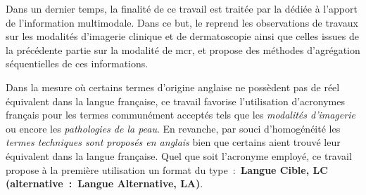 Dans un dernier temps, la finalité de ce travail est traitée par la  dédiée à l'apport de l'information multimodale. Dans ce but, le  reprend les observations de travaux sur les modalités d'imagerie clinique et de dermatoscopie ainsi que celles issues de la précédente partie sur la modalité de \gls{mcr}, et propose des méthodes d'agrégation séquentielles de ces informations.\par

Dans la mesure où certains termes d'origine anglaise ne possèdent pas de réel équivalent dans la langue française, ce travail favorise l'utilisation d'acronymes français pour les termes communément acceptés tels que les \textit{modalités d'imagerie} ou encore les \textit{pathologies de la peau}. En revanche, par souci d'homogénéité les \textit{termes techniques sont proposés en anglais} bien que certains aient trouvé leur équivalent dans la langue française. Quel que soit l’acronyme employé, ce travail propose à la première utilisation un format du type~:~\textbf{Langue Cible, LC (alternative~:~Langue Alternative, LA)}.\par